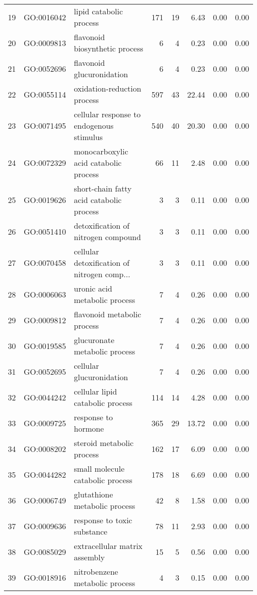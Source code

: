 \begin{table}[ht]
\begin{tabular}{rllrrrrr}
  19 & GO:0016042 & lipid catabolic process & 171 &  19 & 6.43 & 0.00 & 0.00 \\ 
  20 & GO:0009813 & flavonoid biosynthetic process &   6 &   4 & 0.23 & 0.00 & 0.00 \\ 
  21 & GO:0052696 & flavonoid glucuronidation &   6 &   4 & 0.23 & 0.00 & 0.00 \\ 
  22 & GO:0055114 & oxidation-reduction process & 597 &  43 & 22.44 & 0.00 & 0.00 \\ 
  23 & GO:0071495 & cellular response to endogenous stimulus & 540 &  40 & 20.30 & 0.00 & 0.00 \\ 
  24 & GO:0072329 & monocarboxylic acid catabolic process &  66 &  11 & 2.48 & 0.00 & 0.00 \\ 
  25 & GO:0019626 & short-chain fatty acid catabolic process &   3 &   3 & 0.11 & 0.00 & 0.00 \\ 
  26 & GO:0051410 & detoxification of nitrogen compound &   3 &   3 & 0.11 & 0.00 & 0.00 \\ 
  27 & GO:0070458 & cellular detoxification of nitrogen comp... &   3 &   3 & 0.11 & 0.00 & 0.00 \\ 
  28 & GO:0006063 & uronic acid metabolic process &   7 &   4 & 0.26 & 0.00 & 0.00 \\ 
  29 & GO:0009812 & flavonoid metabolic process &   7 &   4 & 0.26 & 0.00 & 0.00 \\ 
  30 & GO:0019585 & glucuronate metabolic process &   7 &   4 & 0.26 & 0.00 & 0.00 \\ 
  31 & GO:0052695 & cellular glucuronidation &   7 &   4 & 0.26 & 0.00 & 0.00 \\ 
  32 & GO:0044242 & cellular lipid catabolic process & 114 &  14 & 4.28 & 0.00 & 0.00 \\ 
  33 & GO:0009725 & response to hormone & 365 &  29 & 13.72 & 0.00 & 0.00 \\ 
  34 & GO:0008202 & steroid metabolic process & 162 &  17 & 6.09 & 0.00 & 0.00 \\ 
  35 & GO:0044282 & small molecule catabolic process & 178 &  18 & 6.69 & 0.00 & 0.00 \\ 
  36 & GO:0006749 & glutathione metabolic process &  42 &   8 & 1.58 & 0.00 & 0.00 \\ 
  37 & GO:0009636 & response to toxic substance &  78 &  11 & 2.93 & 0.00 & 0.00 \\ 
  38 & GO:0085029 & extracellular matrix assembly &  15 &   5 & 0.56 & 0.00 & 0.00 \\ 
  39 & GO:0018916 & nitrobenzene metabolic process &   4 &   3 & 0.15 & 0.00 & 0.00 \\ 

\end{tabular}
\end{table}
